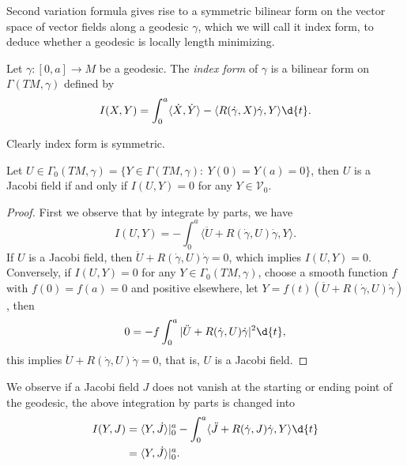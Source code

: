 Second variation formula gives rise to a symmetric bilinear form on the vector space of vector fields along a geodesic $\gamma$, which we will call it index form, to deduce whether a geodesic is locally length minimizing.

\begin{defn}
    Let $\gamma:[0,a]\to M$ be a geodesic.
    The \emph{index form} of $\gamma$ is a bilinear form on $\Gamma(TM,\gamma)$ defined by
    \[I(X,Y)=\int_0^a\langle\dot{X},\dot{Y}\rangle-\langle R(\dot\gamma,X)\dot\gamma,Y\rangle\d{t}.\]
\end{defn}

Clearly index form is symmetric.

\begin{lem}\label{Jacobi field as null space}
    Let $U\in\Gamma_0(TM,\gamma)=\{Y\in\Gamma(TM,\gamma):\ Y(0)=Y(a)=0\}$, then $U$ is a Jacobi field if and only if $I(U,Y)=0$ for any $Y\in\mathscr{V}_0$.
\end{lem}
\begin{proof}
    First we observe that by integrate by parts, we have
    \[I(U,Y)=-\int_0^a\langle\ddot{U}+R(\dot\gamma,U)\dot\gamma,Y\rangle.\]
    If $U$ is a Jacobi field, then $\ddot{U}+R(\dot\gamma,U)\dot\gamma=0$, which implies $I(U,Y)=0$.
    Conversely, if $I(U,Y)=0$ for any $Y\in\Gamma_0(TM,\gamma)$, choose a smooth function $f$ with $f(0)=f(a)=0$ and positive elsewhere, let $Y=f(t)(\ddot{U}+R(\dot\gamma,U)\dot\gamma)$, then
    \[0=-f\int_0^a|\ddot{U}+R(\dot\gamma,U)\dot\gamma|^2\d{t},\]
    this implies $\ddot{U}+R(\dot\gamma,U)\dot\gamma=0$, that is, $U$ is a Jacobi field.
\end{proof}

We observe if a Jacobi field $J$ does not vanish at the starting or ending point of the geodesic, the above integration by parts is changed into
\begin{align*}
    I(Y,J)&=\langle Y,\dot{J}\rangle|_0^a-\int_0^a\langle\ddot{J}+R(\dot\gamma,J)\dot\gamma,Y\rangle\d{t}\\
    &=\langle Y,\dot{J}\rangle|_0^a.
\end{align*}

